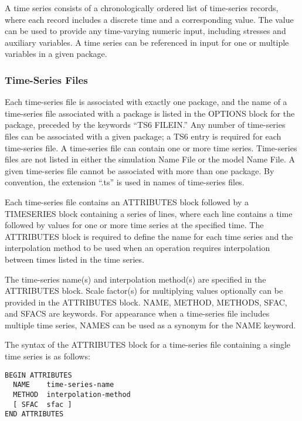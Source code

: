 A time series consists of a chronologically ordered list of time-series records, where each record includes a discrete time and a corresponding value. The value can be used to provide any time-varying numeric input, including stresses and auxiliary variables. A time series can be referenced in input for one or multiple variables in a given package.

\subsubsection{Time-Series Files}

Each time-series file is associated with exactly one package, and the name of a time-series file associated with a package is listed in the OPTIONS block for the package, preceded by the keywords ``TS6 FILEIN.'' Any number of time-series files can be associated with a given package; a TS6 entry is required for each time-series file. A time-series file can contain one or more time series. Time-series files are not listed in either the simulation Name File or the model Name File. A given time-series file cannot be associated with more than one package.  By convention, the extension ``.ts'' is used in names of time-series files.

Each time-series file contains an ATTRIBUTES block followed by a TIMESERIES block containing a series of lines, where each line contains a time followed by values for one or more time series at the specified time. The ATTRIBUTES block is required to define the name for each time series and the interpolation method to be used when an operation requires interpolation between times listed in the time series.

The time-series name(s) and interpolation method(s) are specified in the ATTRIBUTES block. Scale factor(s) for multiplying values optionally can be provided in the ATTRIBUTES block. NAME, METHOD, METHODS, SFAC, and SFACS are keywords. For appearance when a time-series file includes multiple time series, NAMES can be used as a synonym for the NAME keyword.  

The syntax of the ATTRIBUTES block for a time-series file containing a single time series is as follows:

\begin{lstlisting}[style=blockdefinition]
BEGIN ATTRIBUTES
  NAME    time-series-name
  METHOD  interpolation-method
  [ SFAC  sfac ]
END ATTRIBUTES
\end{lstlisting}

